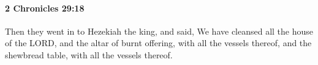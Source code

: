 
		\paragraph{2 Chronicles 29:18} %
			\label{2CHRONICLES-29-18}

			Then they went in to Hezekiah the king, and said, We have cleansed all the house of the LORD, and the altar of burnt offering, with all the vessels thereof, and the shewbread table, with all the vessels thereof.


